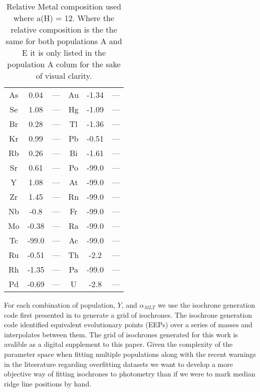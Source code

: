 \begin{table}
\begin{tabular}{c|cc||c|cc}
  As & 0.04 & --- & Au & -1.34 & --- \\
  Se & 1.08 & --- & Hg & -1.09 & --- \\
  Br & 0.28 & --- & Tl & -1.36 & --- \\
  Kr & 0.99 & --- & Pb & -0.51 & --- \\
  Rb & 0.26 & --- & Bi & -1.61 & --- \\
  Sr & 0.61 & --- & Po & -99.0 & --- \\
  Y & 1.08 & --- & At & -99.0 & --- \\
  Zr & 1.45 & --- & Rn & -99.0 & --- \\
  Nb & -0.8 & --- & Fr & -99.0 & --- \\
  Mo & -0.38 & --- & Ra & -99.0 & --- \\
  Tc & -99.0 & --- & Ac & -99.0 & --- \\
  Ru & -0.51 & --- & Th & -2.2 & --- \\
  Rh & -1.35 & --- & Pa & -99.0 & --- \\
  Pd & -0.69 & --- & U & -2.8 & ---
  \end{tabular}
  \caption{Relative Metal composition used where a(H) = 12. Where the relative composition is the the same for both populations A and E it is only listed in the population A colum for the sake of visual clarity.}
  \label{tab:comp}
\end{table}

For each combination of population, $Y$, and $\alpha_{MLT}$ we use the
isochrone generation code first presented in \citet{Dotter2016} to generate a
grid of isochrones. The isochrone generation code identified equivalent
evolutionary points (EEPs) over a series of masses and interpolates between
them. The grid of isochrones generated for this work is avalible as a digital
supplement to this paper. Given the complexity of the parameter space when
fitting multiple populations along with the recent warnings in the liteerature
regarding overfitting datasets \citep[e.g. ][]{Valle2022} we want to develop a
more objective way of fitting isochrones to photometry than if we were to mark
median ridge line positions by hand.

